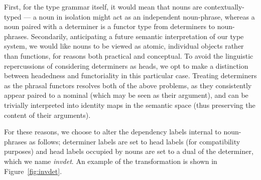 First, for the type grammar itself, it would mean that nouns are contextually-typed --- a noun in isolation might act as an independent noun-phrase, whereas a noun paired with a determiner is a functor type from determiners to noun-phrases.
Secondarily, anticipating a future semantic interpretation of our type system, we would like nouns to be viewed as atomic, individual objects rather than functions, for reasons both practical and conceptual.
To avoid the linguistic repercussions of considering determiners as heads, we opt to make a distinction between headedness and functoriality in this particular case.
Treating determiners as the phrasal functors resolves both of the above problems, as they consistently appear paired to a nominal (which may be seen as their argument), and can be trivially interpreted into identity maps in the semantic space (thus preserving the content of their arguments).

For these reasons, we choose to alter the dependency labels internal to noun-phrases as follows; determiner labels are set to head labels (for compatibility purposes) and head labels occupied by nouns are set to a dual of the determiner, which we name \textit{invdet}.
An example of the transformation is shown in Figure~\ref{fig:invdet}.

